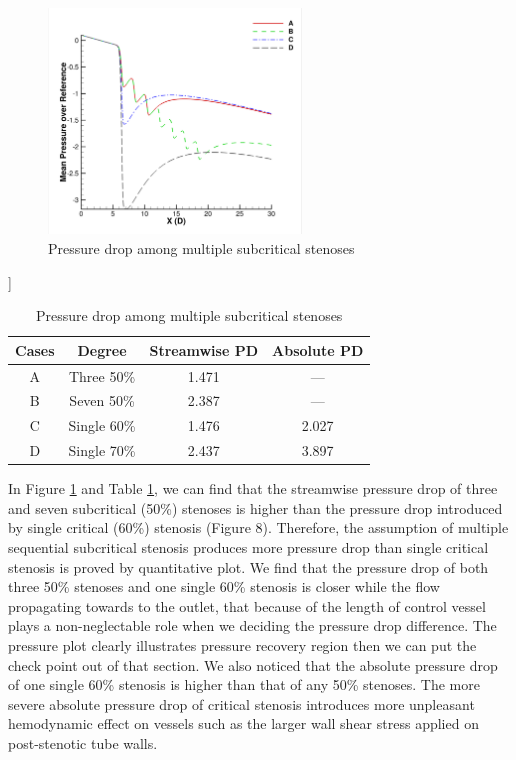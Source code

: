 \begin{figure}[H]
	\centering
	\includegraphics[trim= 1mm 1mm 1mm 1mm,clip,width=0.60\textwidth]{./pics/newcomp.png}
	\caption{Pressure drop among multiple subcritical stenoses}
	\label{fig: pressure drop among multiple subcritical stenoses}
\end{figure}

\begin{table}[h]
	\caption{Pressure drop among multiple subcritical stenoses}]
	\label{Table: pressure drop among multiple subcritical stenoses}
	\vspace{-5pt}
	\begin{center}
	 \begin{tabular}{|c|c|c|c|}
	 	\hline
	 	\textbf{Cases} &\textbf{Degree} & \textbf{Streamwise PD} & \textbf{Absolute PD}\\
	 	\hline
	 	A & Three 50\% & 1.471 & ---\\
	 	\hline
	 	B & Seven 50\% & 2.387 & ---\\
	 	\hline
	 	C & Single 60\% & 1.476 & 2.027\\
	 	\hline
	 	D & Single 70\% & 2.437 & 3.897\\
	 	\hline
	 \end{tabular}
	\end{center} 
\end{table}

In Figure \ref{fig: pressure drop among multiple subcritical stenoses} and Table \ref{Table: pressure drop among multiple subcritical stenoses},  we can find that the streamwise pressure drop of three and seven subcritical (50\%) stenoses is higher than the pressure drop introduced by single critical (60\%) stenosis (Figure 8). 
Therefore, the assumption of multiple sequential subcritical stenosis produces more pressure drop than single critical stenosis is proved by quantitative plot. 
We find that the pressure drop of both three 50\% stenoses and one single 60\% stenosis is closer while the flow propagating towards to the outlet, that because of the length of control vessel plays a non-neglectable role when we deciding the pressure drop difference.
The pressure plot clearly illustrates pressure recovery region then we can put the check point out of that section.
We also noticed that the absolute pressure drop of one single 60\% stenosis is higher than that of any 50\% stenoses. 
The more severe absolute pressure drop of critical stenosis introduces more unpleasant hemodynamic effect on vessels such as the larger wall shear stress applied on post-stenotic tube walls. 

